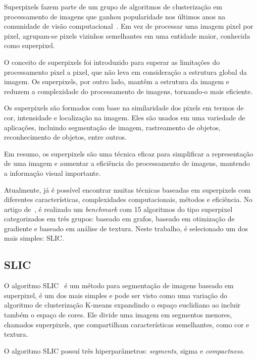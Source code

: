Superpixels fazem parte de um grupo de algoritmos de clusterização em
processamento de imagens que ganhou popularidade nos últimos anos na
comunidade de visão computacional~\cite{SuperpixelSurvey2020}. Em vez
de processar uma imagem pixel por pixel, agrupam-se pixels vizinhos
semelhantes em uma entidade maior, conhecida como superpixel.

O conceito de superpixels foi introduzido para superar as limitações
do processamento pixel a pixel, que não leva em consideração a
estrutura global da imagem. Os superpixels, por outro lado, mantêm a
estrutura da imagem e reduzem a complexidade do processamento de
imagens, tornando-o mais eficiente.

Os superpixels são formados com base na similaridade dos pixels em
termos de cor, intensidade e localização na imagem. Eles são usados em
uma variedade de aplicações, incluindo segmentação de imagem,
rastreamento de objetos, reconhecimento de objetos, entre outros.

Em resumo, os superpixels são uma técnica eficaz para simplificar a
representação de uma imagem e aumentar a eficiência do processamento
de imagens, mantendo a informação visual importante.

Atualmente, já é possível encontrar muitas técnicas baseadas em
superpixels com diferentes características, complexidades
computacionais, métodos e eficiência. No
artigo de~, é realizado um \textit{benchmark} com 15
algoritmos do tipo superpixel categorizados em três grupos: baseado em grafos,
baseado em otimização de gradiente e baseado em análise de
textura. Neste trabalho, é selecionado um dos mais simples: \gls{SLIC}.

\subsection{SLIC}\label{sec:teorica-superpixel-slic}


O algoritmo \gls{SLIC}~\cite{achanta2010slic, achanta2012slic} é um
método para segmentação de imagens baseado em superpixel, é um dos
mais simples e pode ser visto como uma variação do algoritmo de
clusterização K-means expandindo o espaço euclidiano ao incluir também
o espaço de cores. Ele divide uma imagem em segmentos menores,
chamados superpixels, que compartilham características semelhantes,
como cor e textura.

O algoritmo \gls{SLIC} possuí três hiperparâmetros: \textit{segments}, sigma e \textit{compactness}.

